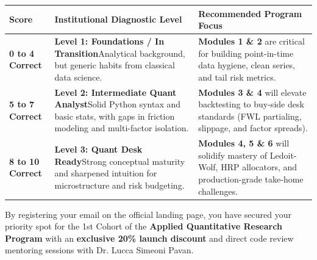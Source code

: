 \documentclass[11pt,a4paper]{article}
\begin{document}
\begin{table}[h]
\centering
\begin{tabular}{p{} p{} p{}}
\toprule
\textbf{Score} & \textbf{Institutional Diagnostic Level} & \textbf{Recommended Program Focus} \\
\midrule
\textbf{0 to 4 Correct} & \textbf{Level 1: Foundations / In Transition}\newline Analytical background, but generic habits from classical data science. & \textbf{Modules 1 \& 2} are critical for building point-in-time data hygiene, clean series, and tail risk metrics. \\
\midrule
\textbf{5 to 7 Correct} & \textbf{Level 2: Intermediate Quant Analyst}\newline Solid Python syntax and basic stats, with gaps in friction modeling and multi-factor isolation. & \textbf{Modules 3 \& 4} will elevate backtesting to buy-side desk standards (FWL partialing, slippage, and factor spreads). \\
\midrule
\textbf{8 to 10 Correct} & \textbf{Level 3: Quant Desk Ready}\newline Strong conceptual maturity and sharpened intuition for microstructure and risk budgeting. & \textbf{Modules 4, 5 \& 6} will solidify mastery of Ledoit-Wolf, HRP allocators, and production-grade take-home challenges. \\
\bottomrule
\end{tabular}
\end{table}

\vspace{10pt}

\begin{answerbox}
By registering your email on the official landing page, you have secured your priority spot for the 1st Cohort of the \textbf{Applied Quantitative Research Program} with an \textbf{exclusive 20\% launch discount} and direct code review mentoring sessions with Dr. Lucca Simeoni Pavan.
\end{answerbox}
\end{document}
